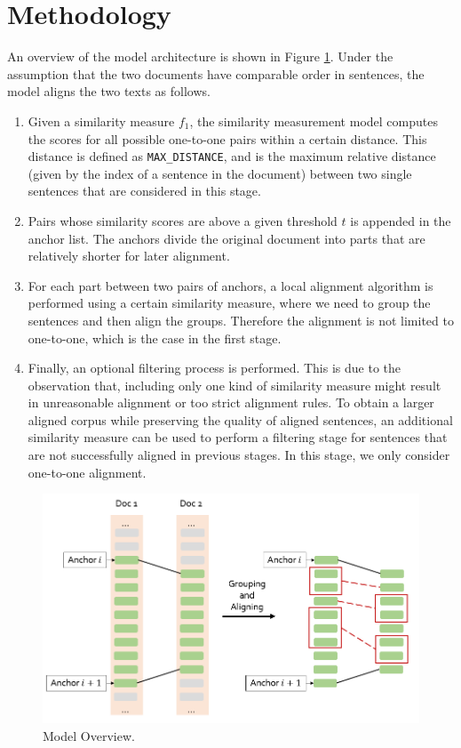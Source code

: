 \documentclass[runningheads]{llncs}
\begin{document}
\section{Methodology}

An overview of the model architecture is shown in Figure \ref{fig:4}. Under the assumption that the two documents have comparable order in sentences, the model aligns the two texts as follows.
\begin{enumerate}
	\item Given a similarity measure $f_1$, the similarity measurement model computes the scores for all possible one-to-one pairs within a certain distance. This distance is defined as \texttt{MAX\_DISTANCE}, and is the maximum relative distance (given by the index of a sentence in the document) between two single sentences that are considered in this stage.
	\item Pairs whose similarity scores are above a given threshold $t$ is appended in the anchor list. The anchors divide the original document into parts that are relatively shorter for later alignment.
	\item For each part between two pairs of anchors, a local alignment algorithm is performed using a certain similarity measure, where we need to group the sentences and then align the groups. Therefore the alignment is not limited to one-to-one, which is the case in the first stage.
	\item Finally, an optional filtering process is performed. This is due to the observation that, including only one kind of similarity measure might result in unreasonable alignment or too strict alignment rules. To obtain a larger aligned corpus while preserving the quality of aligned sentences, an additional similarity measure can be used to perform a filtering stage for sentences that are not successfully aligned in previous stages. In this stage, we only consider one-to-one alignment.
\end{enumerate}

\begin{figure}[htbp]
	\centering
	\includegraphics[width=12cm]{./4.png}
	\caption{Model Overview.}\label{fig:4}
\end{figure}
\end{document}
